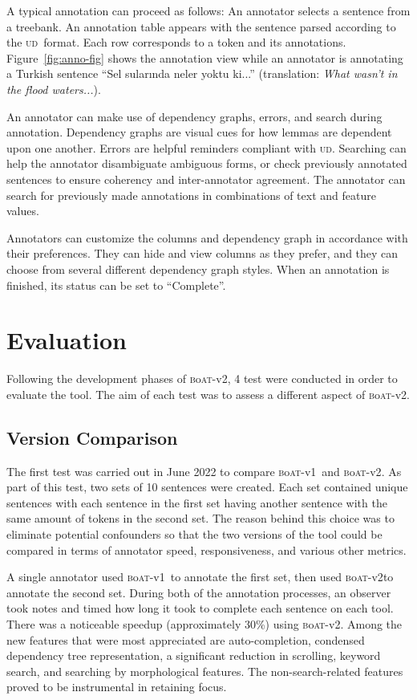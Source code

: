 \documentclass{elektr}
\newcommand{\boatvone}{\textsc{b}o\textsc{at}-{\scriptsize v1}}
\newcommand{\boatvtwo}{\textsc{b}o\textsc{at}-{\scriptsize v2}}
\newcommand{\ud}{\textsc{ud}}
\begin{document}
A typical annotation can proceed as follows:
An annotator selects a sentence from a treebank.
An annotation table appears with the sentence parsed according to the \ud\ format.
Each row corresponds to a token and its annotations.
Figure~\ref{fig:anno-fig} shows the annotation view while an annotator is annotating a Turkish sentence ``Sel sularında neler yoktu ki...'' (translation: \textit{What wasn't in the flood waters...}).

An annotator can make use of dependency graphs, errors, and search during annotation.
Dependency graphs are visual cues for how lemmas are dependent upon one another.
Errors are helpful reminders compliant with \ud.
Searching can help the annotator disambiguate ambiguous forms, or check previously annotated sentences to ensure coherency and inter-annotator agreement.
The annotator can search for previously made annotations in combinations of text and feature values.

Annotators can customize the columns and dependency graph in accordance with their preferences.
They can hide and view columns as they prefer, and they can choose from several different dependency graph styles.
When an annotation is finished, its status can be set to ``Complete''.

% 
\section{Evaluation}
\label{sec:evaluation}

Following the development phases of \boatvtwo, 4 test were conducted in order to evaluate the tool.
The aim of each test was to assess a different aspect of \boatvtwo.

\subsection{Version Comparison}
The first test was carried out in June 2022 to compare \boatvone\ and \boatvtwo.
As part of this test, two sets of 10 sentences were created.
Each set contained unique sentences with each sentence in the first set having another sentence with the same amount of tokens in the second set.
The reason behind this choice was to eliminate potential confounders so that the two versions of the tool could be compared in terms of annotator speed, responsiveness, and various other metrics.

A single annotator used \boatvone\ to annotate the first set, then used \boatvtwo to annotate the second set.
During both of the annotation processes, an observer took notes and timed how long it took to complete each sentence on each tool.
There was a noticeable speedup (approximately 30\%) using \boatvtwo.
Among the new features that were most appreciated are auto-completion, condensed dependency tree representation, a significant reduction in scrolling, keyword search, and searching by morphological features.
The non-search-related features proved to be instrumental in retaining focus.
\end{document}
